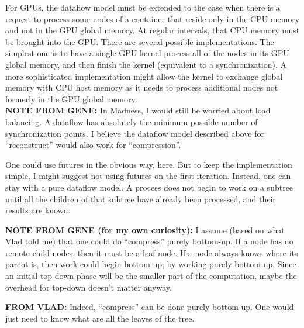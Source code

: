 \documentclass{article}
\begin{document}
For GPUs, the dataflow model must be extended to the case when
there is a request to process some nodes of a container that reside
only in the CPU memory and not in the GPU global memory.  At regular
intervals, that CPU memory must be brought into the GPU.  There are
several possible implementations.  The simplest one is to have a single
GPU kernel process all of the nodes in its GPU global memory, and then
finish the kernel (equivalent to a synchronization).  A more sophisticated
implementation might allow the kernel to exchange global memory with
CPU host memory as it needs to process additional nodes not formerly
in the GPU global memory.
\\

{\bf NOTE FROM GENE:}
In Madness, I would still be worried about load balancing.  A dataflow has
absolutely the minimum possible number of synchronization points.
I believe the dataflow model described above for ``reconstruct'' would
also work for ``compression''.

One could use futures in the obvious way, here.  But to keep the implementation
simple, I might suggest not using futures on the first iteration.  Instead,
one can stay with a pure dataflow model.  A process does not begin
to work on a subtree until all the children of that subtree have
already been processed, and their results are known.

{\bf NOTE FROM GENE (for my own curiosity):}  I assume (based on what Vlad
told me) that one could do ``compress'' purely bottom-up.  If a node has
no remote child nodes, then it must be a leaf node.  If a node always
knows where its parent is, then work could begin bottom-up, by working
purely bottom up.  Since an initial top-down phase will be the smaller
part of the computation, maybe the overhead for top-down doesn't matter
anyway.

{\bf FROM VLAD:} Indeed, ``compress'' can be done purely bottom-up.
One would just need to know what are all the leaves of the tree.
\end{document}
